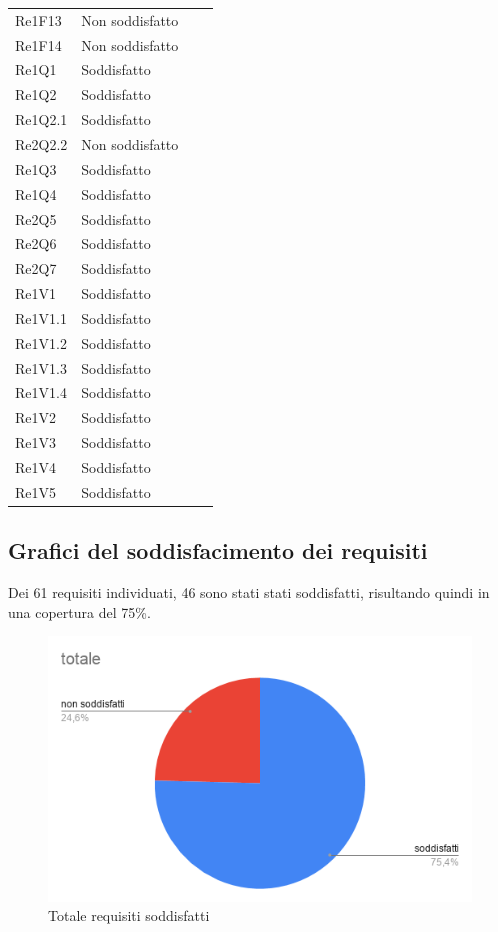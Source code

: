 \begin{longtable}{C{3cm} C{3cm} L{5.5cm} C{3cm}}
Re1F13 	& Non soddisfatto\\
Re1F14 	& Non soddisfatto\\
Re1Q1 	& Soddisfatto\\
Re1Q2 	& Soddisfatto\\
Re1Q2.1 & Soddisfatto\\
Re2Q2.2 & Non soddisfatto\\
Re1Q3 	& Soddisfatto\\
Re1Q4 	& Soddisfatto\\
Re2Q5 	& Soddisfatto\\
Re2Q6 	& Soddisfatto\\
Re2Q7 	& Soddisfatto\\
Re1V1 	& Soddisfatto\\
Re1V1.1 & Soddisfatto\\
Re1V1.2 & Soddisfatto\\
Re1V1.3 & Soddisfatto\\
Re1V1.4 & Soddisfatto\\
Re1V2 	& Soddisfatto\\
Re1V3 	& Soddisfatto\\
Re1V4 	& Soddisfatto\\
Re1V5 	& Soddisfatto\\
\end{longtable}

\subsection{Grafici del soddisfacimento dei requisiti}
Dei 61 requisiti individuati, 46 sono stati stati soddisfatti, risultando quindi in una copertura del 75\%.\\
\begin{figure}[H]
\centering
\includegraphics[scale=0.75]{img/grafici/totale.png}
\caption{Totale requisiti soddisfatti}
\end{figure}

